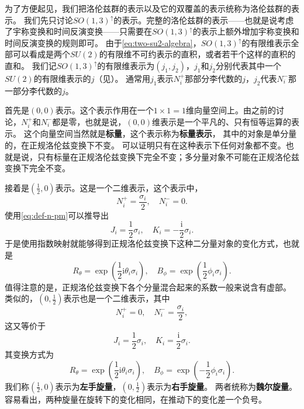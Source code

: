 \documentclass[hyperref, UTF8, a4paper]{ctexart}
\newcommand*{\ii}{\mathrm{i}}
\renewcommand{\autoref}{\prettyref}
\begin{document}
为了方便起见，我们把洛伦兹群的表示以及它的双覆盖的表示统称为洛伦兹群的表示。
我们先只讨论$SO(1,3)^\uparrow$的表示。完整的洛伦兹群的表示——也就是说考虑了宇称变换和时间反演变换——只需要在$SO(1,3)^\uparrow$的表示上额外增加宇称变换和时间反演变换的规则即可。
由于\eqref{eq:two-su2-algebra}，$SO(1,3)^\uparrow$的有限维表示全部可以看成是两个$SU(2)$的有限维不可约表示的直积，或者若干个这样的直积的直和。
我们记$SO(1,3)^\uparrow$的有限维表示为$(j_1, j_2)$，$j_1$和$j_2$分别代表其中一个$SU(2)$的有限维表示的$j$（见\autoref{sec:rotation}）。
通常用$j_1$表示$N^+_i$那部分李代数的$j$，$j_2$代表$N^-_i$那一部分李代数的$j$。

首先是$(0,0)$表示。这个表示作用在一个$1\times1 = 1$维向量空间上。由之前的讨论，$N^+_i$和$N^-_i$都是零，也就是说，$(0,0)$维表示是一个平凡的、只有恒等运算的表示。
这个向量空间当然就是\textbf{标量}，这个表示称为\textbf{标量表示}，
其中的对象是单分量的，在正规洛伦兹变换下不变。
可以证明只有在这种表示下任何对象都不变。也就是说，只有标量在正规洛伦兹变换下完全不变；多分量对象不可能在正规洛伦兹变换下完全不变。

接着是$(\frac{1}{2}, 0)$表示。这是一个二维表示，这个表示中，
\begin{equation}
    N^+_i = \frac{\sigma_i}{2}, \quad N^-_i = 0.
\end{equation}
使用\eqref{eq:def-n-pm}可以推导出
\begin{equation}
    J_i = \frac{1}{2} \sigma_i, \quad K_i = - \frac{\ii}{2} \sigma_i.
\end{equation}
于是使用指数映射就能够得到正规洛伦兹变换下这种二分量对象的变化方式，也就是
\begin{equation}
    R_\theta = \exp \left( \frac{1}{2} \ii \theta_i \sigma_i \right), \quad B_\phi = \exp \left( \frac{1}{2} \phi_i \sigma_i \right).
\end{equation}
值得注意的是，正规洛伦兹变换下各个分量混合起来的系数一般来说含有虚部。
类似的，$(0, \frac{1}{2})$表示也是一个二维表示，其中
\begin{equation}
    N^+_i = 0, \quad N^-_i = \frac{\sigma_i}{2},
\end{equation}
这又等价于
\begin{equation}
    J_i = \frac{1}{2} \sigma_i, \quad K_i = \frac{\ii}{2} \sigma_i.
\end{equation}
其变换方式为
\begin{equation}
    R_\theta = \exp \left( \frac{1}{2} \ii \theta_i \sigma_i \right), \quad B_\phi = \exp \left( - \frac{1}{2} \phi_i \sigma_i \right).
\end{equation}
我们称$(\frac{1}{2}, 0)$表示为\textbf{左手旋量}，$(0, \frac{1}{2})$表示为\textbf{右手旋量}。
两者统称为\textbf{魏尔旋量}。容易看出，两种旋量在旋转下的变化相同，在推动下的变化差一个负号。
\end{document}

